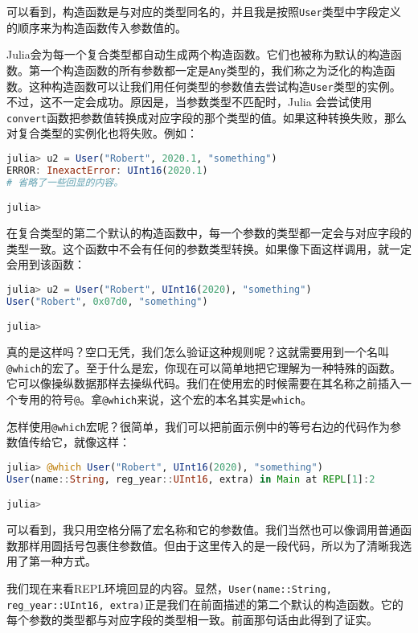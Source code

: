 可以看到，构造函数是与对应的类型同名的，并且我是按照\verb|User|类型中字段定义的顺序来为构造函数传入参数值的。

Julia会为每一个复合类型都自动生成两个构造函数。它们也被称为默认的构造函数。第一个构造函数的所有参数都一定是\verb|Any|类型的，我们称之为泛化的构造函数。这种构造函数可以让我们用任何类型的参数值去尝试构造\verb|User|类型的实例。不过，这不一定会成功。原因是，当参数类型不匹配时，Julia 会尝试使用\verb|convert|函数把参数值转换成对应字段的那个类型的值。如果这种转换失败，那么对复合类型的实例化也将失败。例如：

\begin{lstlisting}[language=julia]
julia> u2 = User("Robert", 2020.1, "something")
ERROR: InexactError: UInt16(2020.1)
# 省略了一些回显的内容。

julia> 
\end{lstlisting}

在复合类型的第二个默认的构造函数中，每一个参数的类型都一定会与对应字段的类型一致。这个函数中不会有任何的参数类型转换。如果像下面这样调用，就一定会用到该函数：

\begin{lstlisting}[language=julia]
julia> u2 = User("Robert", UInt16(2020), "something")
User("Robert", 0x07d0, "something")

julia> 
\end{lstlisting}

真的是这样吗？空口无凭，我们怎么验证这种规则呢？这就需要用到一个名叫\verb|@which|的宏了。至于什么是宏，你现在可以简单地把它理解为一种特殊的函数。它可以像操纵数据那样去操纵代码。我们在使用宏的时候需要在其名称之前插入一个专用的符号\verb|@|。拿\verb|@which|来说，这个宏的本名其实是\verb|which|。

怎样使用\verb|@which|宏呢？很简单，我们可以把前面示例中的等号右边的代码作为参数值传给它，就像这样：

\begin{lstlisting}[language=julia]
julia> @which User("Robert", UInt16(2020), "something")
User(name::String, reg_year::UInt16, extra) in Main at REPL[1]:2

julia> 
\end{lstlisting}

可以看到，我只用空格分隔了宏名称和它的参数值。我们当然也可以像调用普通函数那样用圆括号包裹住参数值。但由于这里传入的是一段代码，所以为了清晰我选用了第一种方式。

我们现在来看REPL环境回显的内容。显然，\verb|User(name::String, reg_year::UInt16, extra)|正是我们在前面描述的第二个默认的构造函数。它的每个参数的类型都与对应字段的类型相一致。前面那句话由此得到了证实。


